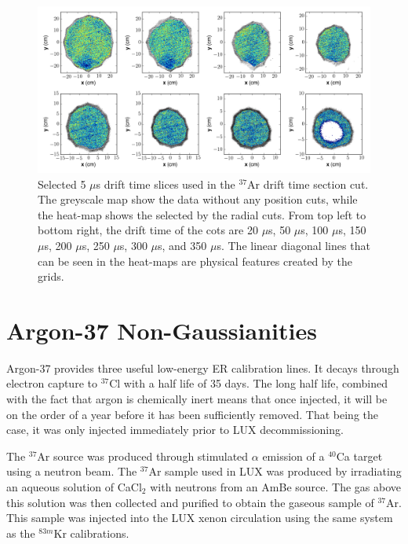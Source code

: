 \begin{figure}[h!]
\centering
  \includegraphics[width=\textwidth]{Figures/xycut_xy.png}
\caption{Selected 5 $\mu$s drift time slices used in the $^{37}$Ar drift time section cut. The greyscale map show the data without any position cuts, while the heat-map shows the selected by the radial cuts. From top left to bottom right, the drift time of the cots are 20 $\mu$s, 50 $\mu$s, 100 $\mu$s, 150 $\mu$s, 200 $\mu$s, 250 $\mu$s, 300 $\mu$s, and 350 $\mu$s. The linear diagonal lines that can be seen in the heat-maps are physical features created by the grids.}
\label{fig:xycut_xy}
\end{figure}



\section{Argon-37 Non-Gaussianities}
Argon-37 provides three useful low-energy ER calibration lines. It decays through electron capture to $^{37}$Cl with a half life of 35 days. The long half life, combined with the fact that argon is chemically inert means that once injected, it will be on the order of a year before it has been sufficiently removed. That being the case, it was only injected immediately prior to LUX decommissioning\cite{ar371,pixey_ar37}.

The $^{37}$Ar source was produced through stimulated $\alpha$ emission of a $^{40}$Ca target using a neutron beam. The $^{37}$Ar sample used in LUX was produced by irradiating an aqueous solution of CaCl$_2$ with neutrons from an AmBe source. The gas above this solution was then collected and purified to obtain the gaseous sample of $^{37}$Ar\cite{pixey_ar37}. This sample was injected into the LUX xenon circulation using the same system as the $^{83m}$Kr calibrations\cite{lux_kr2}.

